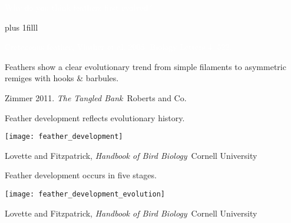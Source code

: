 \documentclass[t]{beamer}
\begin{document}
{
\begin{frame}[t,plain]{\textcolor{white}{Why do you think feathers first evolved?}}

	

	
	\vskip0pt plus 1filll

\hfill\tiny\textcolor{white}{Cretaceous feather, Vinther et al. 2008. Biology Letters 4: 522.}	
\end{frame}
}
%
{
\begin{frame}[b,plain]{Feathers show a clear evolutionary trend from simple filaments to asymmetric remiges with hooks {\normalsize \&} barbules.}

\vfilll

\tiny \hfill Zimmer 2011. \textit{The Tangled Bank} \textcopyright\,Roberts and Co.

\end{frame}
}
%
\begin{frame}[t,plain]{Feather development reflects evolutionary history.}


	\texttt{[image: feather\_development]}
	
	\vfilll
	
	\tiny \hfill Lovette and Fitzpatrick, \textit{Handbook of Bird Biology} \textcopyright\,Cornell University
	
\end{frame}
%
\begin{frame}[t,plain]{Feather development occurs in five stages.}


	\centering
	
	\texttt{[image: feather\_development\_evolution]}
	
	\vfilll
	
	\tiny \hfill Lovette and Fitzpatrick, \textit{Handbook of Bird Biology} \textcopyright\,Cornell University
	
\end{frame}
%
\end{document}
